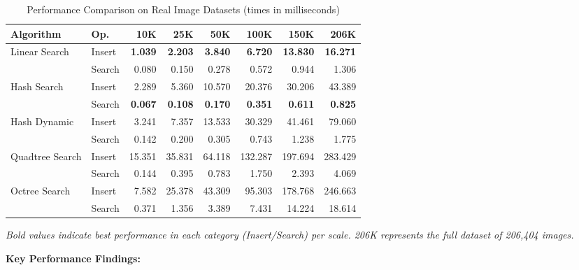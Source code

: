 \documentclass{sbc2023}
\begin{document}
\begin{table}[H]
    \footnotesize 
    \centering
    \caption{Performance Comparison on Real Image Datasets (times in milliseconds)} 
    \label{tab:real_performance_ms}
    \setlength{\tabcolsep}{2pt} 
    \begin{tabular}{ll rrrrrr} 
        \toprule
        \textbf{Algorithm} & \textbf{Op.} & \textbf{10K} & \textbf{25K} & \textbf{50K} & \textbf{100K} & \textbf{150K} & \textbf{206K} \\
        \midrule
        \multirow{2}{*}{Linear Search} & Insert & \textbf{1.039} & \textbf{2.203} & \textbf{3.840} & \textbf{6.720} & \textbf{13.830} & \textbf{16.271} \\
        & Search & 0.080 & 0.150 & 0.278 & 0.572 & 0.944 & 1.306 \\
        \cmidrule(lr){2-8}
        \multirow{2}{*}{Hash Search} & Insert & 2.289 & 5.360 & 10.570 & 20.376 & 30.206 & 43.389 \\
        & Search & \textbf{0.067} & \textbf{0.108} & \textbf{0.170} & \textbf{0.351} & \textbf{0.611} & \textbf{0.825} \\
        \cmidrule(lr){2-8}
        \multirow{2}{*}{Hash Dynamic} & Insert & 3.241 & 7.357 & 13.533 & 30.329 & 41.461 & 79.060 \\
        & Search & 0.142 & 0.200 & 0.305 & 0.743 & 1.238 & 1.775 \\
        \cmidrule(lr){2-8}
        \multirow{2}{*}{Quadtree Search} & Insert & 15.351 & 35.831 & 64.118 & 132.287 & 197.694 & 283.429 \\
        & Search & 0.144 & 0.395 & 0.783 & 1.750 & 2.393 & 4.069 \\
        \cmidrule(lr){2-8}
        \multirow{2}{*}{Octree Search} & Insert & 7.582 & 25.378 & 43.309 & 95.303 & 178.768 & 246.663 \\
        & Search & 0.371 & 1.356 & 3.389 & 7.431 & 14.224 & 18.614 \\
        \bottomrule
    \end{tabular}
    \vspace{0.2cm}
    \begin{minipage}{\columnwidth}
    \footnotesize
    \textit{Bold values indicate best performance in each category (Insert/Search) per scale. 206K represents the full dataset of 206,404 images.}
    \end{minipage}
\end{table}

\textbf{Key Performance Findings:}
\end{document}
